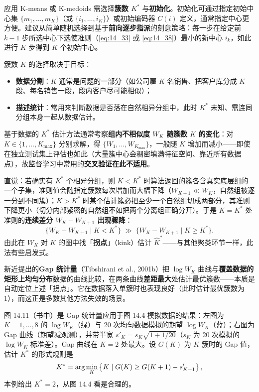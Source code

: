 应用 K-means 或 K-medoids 需选择\textbf{簇数 $K^*$} 与\textbf{初始化}。初始化可通过指定初始中心集 $\{m_1,\dots,m_K\}$（或 $\{i_1,\dots,i_K\}$）或初始编码器 $C(i)$ 定义，通常指定中心更方便。建议从简单随机选择到基于\textbf{前向逐步指派}的刻意策略：每一步在给定前 $k-1$ 步所选中心下选使准则（\eqref{eq:14_33} 或 \eqref{eq:14_38}）最小的新中心 $i_k$，如此进行 $K$ 步得到 $K$ 个初始中心。

簇数 $K$ 的选择取决于目标：
\begin{itemize}[itemsep=1pt]
\item \textbf{数据分割}：$K$ 通常是问题的一部分（如公司雇 $K$ 名销售、把客户库分成 $K$ 段、每名销售一段，段内客户尽可能相似）；
\item \textbf{描述统计}：常用来判断数据是否落在自然相异分组中，此时 $K^*$ 未知、需连同分组本身一起从数据估计。
\end{itemize}

基于数据的 $K^*$ 估计方法通常考察\textbf{组内不相似度 $W_K$ 随簇数 $K$ 的变化}：对 $K\in\{1,\dots,K_{\max}\}$ 分别求解，得 $\{W_1,\dots,W_{K_{\max}}\}$，一般随 $K$ 增加而减小——即使在独立测试集上评估也如此（大量簇中心会稠密填满特征空间、靠近所有数据点），故监督学习中常用的\textbf{交叉验证在此不适用}。

直觉：若确实有 $K^*$ 个相异分组，则 $K<K^*$ 时算法返回的簇各含真实底层组的一个子集，准则值会随指定簇数每次增加而大幅下降（$W_{K+1}\ll W_K$，自然组被逐一分到不同簇）；$K>K^*$ 时某个估计簇必把至少一个自然组切成两部分，其准则下降更小（切分内部紧密的自然组不如把两个分离组正确分开）。于是 $K=K^*$ 处准则的\textbf{连续差分 $W_K-W_{K+1}$ 出现骤降}：
\[
\{W_K-W_{K+1}\mid K<K^*\}\;\gg\;\{W_K-W_{K+1}\mid K\ge K^*\}.
\]
由此在 $W_K$ 对 $K$ 的图中找「\textbf{拐点}」（kink）估计 $\hat K^*$——与其他聚类环节一样，此法有些启发式。

新近提出的\textbf{Gap 统计量}（Tibshirani et al., 2001b）把 $\log W_K$ 曲线与\textbf{覆盖数据的矩形上均匀分布}数据的曲线比较，在两条曲线\textbf{差距最大}处估计最优簇数——本质是自动定位上述「拐点」。它在数据落入单簇时也表现良好（此时估计最优簇数为 1），而这正是多数其他方法失效的场景。

\begin{remark}
图 14.11（书中）是 Gap 统计量应用于图 14.4 模拟数据的结果：左图为 $K=1,\dots,8$ 的 $\log W_K$（绿）与 20 次均匀数据模拟的期望 $\log W_K$（蓝）；右图为 Gap 曲线（期望减观测），并带半宽 $s'_K=s_K\sqrt{1+1/20}$（$s_K$ 为 20 次模拟的 $\log W_K$ 标准差）。Gap 曲线在 $K=2$ 处最大。设 $G(K)$ 为 $K$ 簇时的 Gap 值，估计 $K^*$ 的形式规则是
\begin{equation}
K^* = \arg\min_{K}\left\{K \mid G(K)\ge G(K+1)-s'_{K+1}\right\}, \label{eq:14_39}
\end{equation}
本例给出 $K^*=2$，从图 14.4 看是合理的。
\end{remark}

